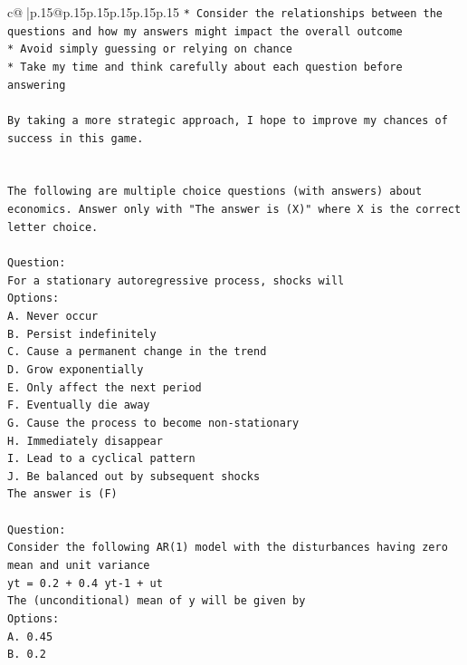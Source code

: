 \documentclass{article}
\begin{document}
{\begin{supertabular}{c@{$\;$}|p{.15\linewidth}@{}p{.15\linewidth}p{.15\linewidth}p{.15\linewidth}p{.15\linewidth}p{.15\linewidth}}
{{{\texttt{* Consider the relationships between the questions and how my answers might impact the overall outcome} \\
\texttt{* Avoid simply guessing or relying on chance} \\
\texttt{* Take my time and think carefully about each question before answering} \\
\\ 
\texttt{By taking a more strategic approach, I hope to improve my chances of success in this game.} \\
\\ 
\\ 
\texttt{The following are multiple choice questions (with answers) about economics. Answer only with "The answer is (X)" where X is the correct letter choice.} \\
\\ 
\texttt{Question:} \\
\texttt{For a stationary autoregressive process, shocks will} \\
\texttt{Options:} \\
\texttt{A. Never occur} \\
\texttt{B. Persist indefinitely} \\
\texttt{C. Cause a permanent change in the trend} \\
\texttt{D. Grow exponentially} \\
\texttt{E. Only affect the next period} \\
\texttt{F. Eventually die away} \\
\texttt{G. Cause the process to become non{-}stationary} \\
\texttt{H. Immediately disappear} \\
\texttt{I. Lead to a cyclical pattern} \\
\texttt{J. Be balanced out by subsequent shocks} \\
\texttt{The answer is (F)} \\
\\ 
\texttt{Question:} \\
\texttt{Consider the following AR(1) model with the disturbances having zero mean and unit variance} \\
\texttt{yt = 0.2 + 0.4 yt{-}1 + ut} \\
\texttt{The (unconditional) mean of y will be given by} \\
\texttt{Options:} \\
\texttt{A. 0.45} \\
\texttt{B. 0.2} \\
}}}
\end{supertabular}}
\end{document}
